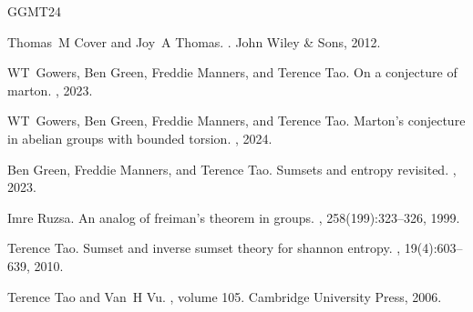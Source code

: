 \documentclass{article}
\begin{document}
\begin{thebibliography}{GGMT24}

Thomas~M Cover and Joy~A Thomas.
.
\newblock John Wiley \& Sons, 2012.

WT~Gowers, Ben Green, Freddie Manners, and Terence Tao.
\newblock On a conjecture of marton.
, 2023.

WT~Gowers, Ben Green, Freddie Manners, and Terence Tao.
\newblock Marton's conjecture in abelian groups with bounded torsion.
, 2024.

Ben Green, Freddie Manners, and Terence Tao.
\newblock Sumsets and entropy revisited.
, 2023.

Imre Ruzsa.
\newblock An analog of freiman's theorem in groups.
, 258(199):323--326, 1999.

Terence Tao.
\newblock Sumset and inverse sumset theory for shannon entropy.
, 19(4):603--639, 2010.

Terence Tao and Van~H Vu.
, volume 105.
\newblock Cambridge University Press, 2006.

\end{thebibliography}
\end{document}
